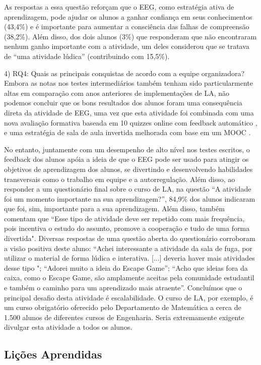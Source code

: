 As respostas a essa questão reforçam que o EEG, como estratégia ativa de aprendizagem, pode ajudar os alunos a ganhar confiança em seus conhecimentos (43,4\%) e é importante para aumentar a consciência das falhas de compreensão (38,2\%). Além disso, dos dois alunos (3\%) que responderam que não encontraram nenhum ganho importante com a atividade, um deles considerou que se tratava de “uma atividade lúdica” (contribuindo com 15,5\%).

4) RQ4: Quais as principais conquistas de acordo com a equipe organizadora?
Embora as notas nos testes intermediários também tenham sido particularmente altas em comparação com anos anteriores de implementações de LA, não podemos concluir que os bons resultados dos alunos foram uma consequência direta da atividade de EEG, uma vez que esta atividade foi combinada com uma nova avaliação formativa baseada em 10 quizzes online com feedback automático \citep{santos_assessment_2017}, e uma estratégia de sala de aula invertida melhorada com base em um MOOC \citep{nicholson_peeking_2015}.

No entanto, juntamente com um desempenho de alto nível nos testes escritos, o feedback dos alunos apóia a ideia de que o EEG pode ser usado para atingir os objetivos de aprendizagem dos alunos, se divertindo e desenvolvendo habilidades transversais como o trabalho em equipe e a autorregulação. Além disso, ao responder a um questionário final sobre o curso de LA, na questão “A atividade foi um momento importante na sua aprendizagem?”, 84,9\% dos alunos indicaram que foi, sim, importante para a sua aprendizagem. Além disso, também comentam que “Esse tipo de atividade deve ser repetido com mais frequência, pois incentiva o estudo do assunto, promove a cooperação e tudo de uma forma divertida". Diversas respostas de uma questão aberta do questionário corroboram a visão positiva deste aluno: “Achei interessante a atividade da sala de fuga, por utilizar o material de forma lúdica e interativa. [...] deveria haver mais atividades desse tipo "; “Adorei muito a ideia do Escape Game”; “Acho que ideias fora da caixa, como o Escape Game, são amplamente aceitas pela comunidade estudantil e também o caminho para um aprendizado mais atraente”. Concluímos que o principal desafio desta atividade é escalabilidade. O curso de LA, por exemplo, é um curso obrigatório oferecido pelo Departamento de Matemática a cerca de 1.500 alunos de diferentes cursos de Engenharia. Seria extremamente exigente divulgar esta atividade a todos os alunos.

\subsection{Lições Aprendidas}

